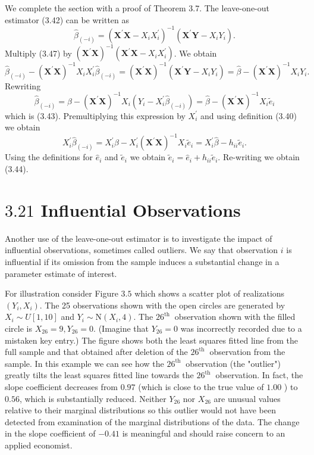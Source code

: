 \documentclass[10pt]{article}
\begin{document}
We complete the section with a proof of Theorem 3.7. The leave-one-out estimator (3.42) can be written as
$$
\widehat{\beta}_{(-i)}=\left(\boldsymbol{X}^{\prime} \boldsymbol{X}-X_{i} X_{i}^{\prime}\right)^{-1}\left(\boldsymbol{X}^{\prime} \boldsymbol{Y}-X_{i} Y_{i}\right) .
$$
Multiply (3.47) by $\left(\boldsymbol{X}^{\prime} \boldsymbol{X}\right)^{-1}\left(\boldsymbol{X}^{\prime} \boldsymbol{X}-X_{i} X_{i}^{\prime}\right)$. We obtain
$$
\widehat{\beta}_{(-i)}-\left(\boldsymbol{X}^{\prime} \boldsymbol{X}\right)^{-1} X_{i} X_{i}^{\prime} \widehat{\beta}_{(-i)}=\left(\boldsymbol{X}^{\prime} \boldsymbol{X}\right)^{-1}\left(\boldsymbol{X}^{\prime} \boldsymbol{Y}-X_{i} Y_{i}\right)=\widehat{\beta}-\left(\boldsymbol{X}^{\prime} \boldsymbol{X}\right)^{-1} X_{i} Y_{i} .
$$
Rewriting
$$
\widehat{\beta}_{(-i)}=\widehat{\beta}-\left(\boldsymbol{X}^{\prime} \boldsymbol{X}\right)^{-1} X_{i}\left(Y_{i}-X_{i}^{\prime} \widehat{\beta}_{(-i)}\right)=\widehat{\beta}-\left(\boldsymbol{X}^{\prime} \boldsymbol{X}\right)^{-1} X_{i} \widetilde{e}_{i}
$$
which is (3.43). Premultiplying this expression by $X_{i}^{\prime}$ and using definition (3.40) we obtain
$$
X_{i}^{\prime} \widehat{\beta}_{(-i)}=X_{i}^{\prime} \widehat{\beta}-X_{i}^{\prime}\left(\boldsymbol{X}^{\prime} \boldsymbol{X}\right)^{-1} X_{i} \widetilde{e}_{i}=X_{i}^{\prime} \widehat{\beta}-h_{i i} \widetilde{e}_{i} .
$$
Using the definitions for $\widehat{e}_{i}$ and $\widetilde{e}_{i}$ we obtain $\widetilde{e}_{i}=\widehat{e}_{i}+h_{i i} \widetilde{e}_{i}$. Re-writing we obtain (3.44).

\section{$3.21$ Influential Observations}
Another use of the leave-one-out estimator is to investigate the impact of influential observations, sometimes called outliers. We say that observation $i$ is influential if its omission from the sample induces a substantial change in a parameter estimate of interest.

For illustration consider Figure $3.5$ which shows a scatter plot of realizations $\left(Y_{i}, X_{i}\right)$. The 25 observations shown with the open circles are generated by $X_{i} \sim U[1,10]$ and $Y_{i} \sim \mathrm{N}\left(X_{i}, 4\right)$. The $26^{\text {th }}$ observation shown with the filled circle is $X_{26}=9, Y_{26}=0$. (Imagine that $Y_{26}=0$ was incorrectly recorded due to a mistaken key entry.) The figure shows both the least squares fitted line from the full sample and that obtained after deletion of the $26^{\text {th }}$ observation from the sample. In this example we can see how the $26^{\text {th }}$ observation (the "outlier") greatly tilts the least squares fitted line towards the $26^{\text {th }}$ observation. In fact, the slope coefficient decreases from $0.97$ (which is close to the true value of $1.00$ ) to $0.56$, which is substantially reduced. Neither $Y_{26}$ nor $X_{26}$ are unusual values relative to their marginal distributions so this outlier would not have been detected from examination of the marginal distributions of the data. The change in the slope coefficient of $-0.41$ is meaningful and should raise concern to an applied economist.
\end{document}
